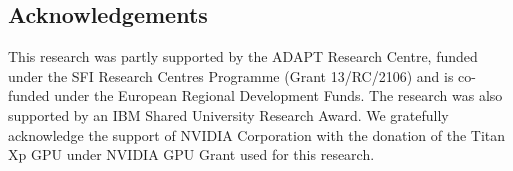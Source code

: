 \documentclass[a0,portrait]{a0poster}
\begin{document}
\begin{multicols}{2}



\color{tudLogoColor}

\section*{Acknowledgements}

\color{black}

This research was partly supported by the ADAPT Research Centre, funded under the SFI Research Centres Programme (Grant 13/RC/2106) and is co-funded under the European Regional Development Funds. The research was also supported by an IBM Shared University Research Award. We gratefully acknowledge the support of NVIDIA Corporation with the donation of the Titan Xp GPU under NVIDIA GPU Grant used for this research.


\end{multicols}
\end{document}
